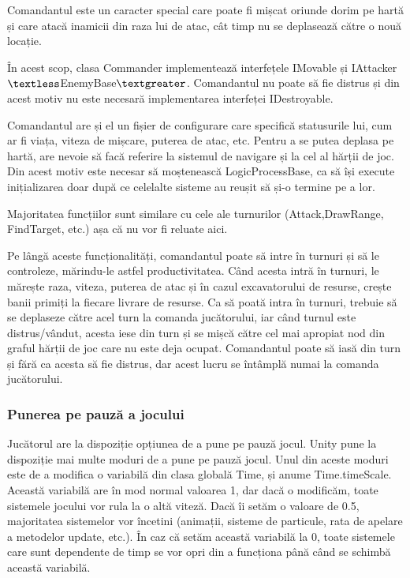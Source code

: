 \documentclass[12pt, a4paper]{article}
\begin{document}
	Comandantul este un caracter special care poate fi mișcat oriunde dorim pe hartă și care atacă inamicii din raza lui de atac, cât timp nu se deplasează către o nouă locație.
	\newline
	
	În acest scop, clasa Commander implementează interfețele IMovable și IAttacker$\textless$EnemyBase$\textgreater$. Comandantul nu poate să fie distrus și din acest motiv nu este necesară implementarea interfeței IDestroyable.
	\newline
	
	Comandantul are și el un fișier de configurare care specifică statusurile lui, cum ar fi viața, viteza de mișcare, puterea de atac, etc. Pentru a se putea deplasa pe hartă, are nevoie să facă referire la sistemul de navigare și la cel al hărții de joc. Din acest motiv este necesar să moștenească LogicProcessBase, ca să își execute inițializarea doar după ce celelalte sisteme au reușit să și-o termine pe a lor.
	\newline
	
	Majoritatea funcțiilor sunt similare cu cele ale turnurilor (Attack,\newline DrawRange, FindTarget, etc.) așa că nu vor fi reluate aici. 
	\newline
	
	Pe lângă aceste funcționalități, comandantul poate să intre în turnuri și să le controleze, mărindu-le astfel productivitatea. Când acesta intră în turnuri, le mărește raza, viteza, puterea de atac și în cazul excavatorului de resurse, crește banii primiți la fiecare livrare de resurse. Ca să poată intra în turnuri, trebuie să se deplaseze către acel turn la comanda jucătorului, iar când turnul este distrus/vândut, acesta iese din turn și se mișcă către cel mai apropiat nod din graful hărții de joc care nu este deja ocupat. Comandantul poate să iasă din turn și fără ca acesta să fie distrus, dar acest lucru se întâmplă numai la comanda jucătorului.
	
	
	
	
	
	\subsubsection{Punerea pe pauză a jocului}
	
	Jucătorul are la dispoziție opțiunea de a pune pe pauză jocul. Unity pune la dispoziție mai multe moduri de a pune pe pauză jocul. Unul din aceste moduri este de a modifica o variabilă din clasa globală Time, și anume Time.timeScale. Această variabilă are în mod normal valoarea 1, dar dacă o modificăm, toate sistemele jocului vor rula la o altă viteză. Dacă îi setăm o valoare de 0.5, majoritatea sistemelor vor încetini (animații, sisteme de particule, rata de apelare a metodelor update, etc.). În caz că setăm această variabilă la 0, toate sistemele care sunt dependente de timp se vor opri din a funcționa până când se schimbă această variabilă. 
	\newline
	
\end{document}

